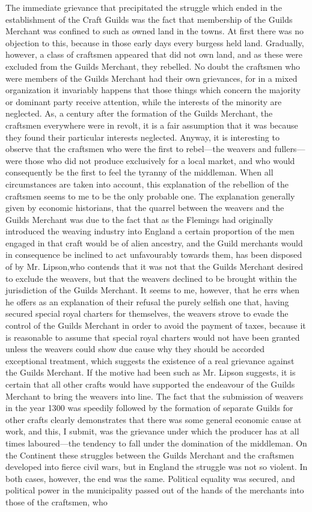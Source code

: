 \documentclass{book}
\begin{document}
The immediate grievance that precipitated the struggle which ended in the establishment of the Craft Guilds was the fact that membership of the Guilds Merchant was confined to such as owned land in the towns. At first there was no objection to this, because in those early days every burgess held land. Gradually, however, a class of craftsmen appeared that did not own land, and as these were excluded from the Guilds Merchant, they rebelled. No doubt the craftsmen who were members of the Guilds Merchant had their own grievances, for in a mixed organization it invariably happens that those things which concern the majority or dominant party receive attention, while the interests of the minority are neglected. As, a century after the formation of the Guilds Merchant, the craftsmen everywhere were in revolt, it is a fair assumption that it was because they found their particular interests neglected. Anyway, it is interesting to observe that the craftsmen who were the first to rebel—the weavers and fullers—were those who did not produce exclusively for a local market, and who would consequently be the first to feel the tyranny of the middleman. When all circumstances are taken into account, this explanation of the rebellion of the craftsmen seems to me to be the only probable one. The explanation generally given by economic historians, that the quarrel between the weavers and the Guilds Merchant was due to the fact that as the Flemings had originally introduced the weaving industry into England a certain proportion of the men engaged in that craft would be of alien ancestry, and the Guild merchants would in consequence be inclined to act unfavourably towards them, has been disposed of by Mr. Lipson,\footnotemark[6] who contends that it was not that the Guilds Merchant desired to exclude the weavers, but that the weavers declined to be brought within the jurisdiction of the Guilds Merchant. It seems to me, however, that he errs when he offers as an explanation of their refusal the purely selfish one that, having secured special royal charters for themselves, the weavers strove to evade the control of the Guilds Merchant in order to avoid the payment of taxes, because it is reasonable to assume that special royal charters would not have been granted unless the weavers could show due cause why they should be accorded exceptional treatment, which suggests the existence of a real grievance against the Guilds Merchant. If the motive had been such as Mr. Lipson suggests, it is certain that all other crafts would have supported the endeavour of the Guilds Merchant to bring the weavers into line. The fact that the submission of weavers in the year 1300 was speedily followed by the formation of separate Guilds for other crafts clearly demonstrates that there was some general economic cause at work, and this, I submit, was the grievance under which the producer has at all times laboured—the tendency to fall under the domination of the middleman. On the Continent these struggles between the Guilds Merchant and the craftsmen developed into fierce civil wars, but in England the struggle was not so violent. In both cases, however, the end was the same. Political equality was secured, and political power in the municipality passed out of the hands of the merchants into those of the craftsmen, who 
\end{document}

